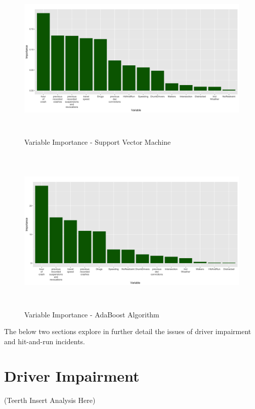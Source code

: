 \documentclass[11pt, oneside,titlepage]{article}   	%
\begin{document}
\begin{figure}[H]
\centering
  \includegraphics[width=15cm,height=8cm,keepaspectratio]{ImportancePlot_SVM.png}
\caption{Variable Importance - Support Vector Machine}
\end{figure}

\begin{figure}[H]
\centering
  \includegraphics[width=15cm,height=8cm,keepaspectratio]{ImportancePlot_ADABoost.png}
\caption{Variable Importance - AdaBoost Algorithm}
\end{figure}

The below two sections explore in further detail the issues of driver impairment and hit-and-run incidents.

\section*{Driver Impairment}

(Teerth Insert Analysis Here)
\end{document}
